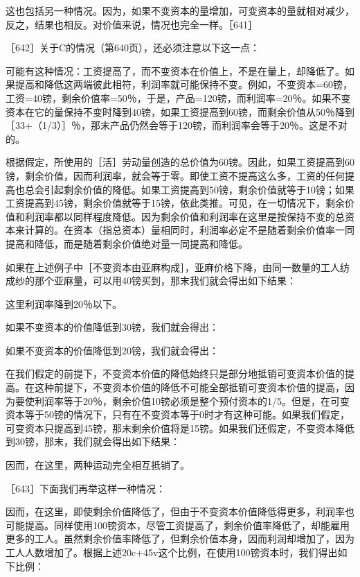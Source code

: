 这也包括另一种情况。因为，如果不变资本的量增加，可变资本的量就相对减少，反之，结果也相反。对价值来说，情况也完全一样。［641］


［642］关于C的情况（第640页），还必须注意以下这一点：

可能有这种情况：工资提高了，而不变资本在价值上，不是在量上，却降低了。如果提高和降低这两端彼此相符，利润率就可能保持不变。例如，不变资本=60镑，工资=40镑，剩余价值率=50％，于是，产品=120镑，而利润率=20％。如果不变资本在它的量保持不变时降到40镑，如果工资提高到60镑，而剩余价值从50％降到［33+（1/3）］％，那末产品仍然会等于120镑，而利润率会等于20％。这是不对的。

根据假定，所使用的［活］劳动量创造的总价值为60镑。因此，如果工资提高到60镑，剩余价值，因而利润率，就会等于零。即使工资不提高这么多，工资的任何提高也总会引起剩余价值的降低。如果工资提高到50镑，剩余价值就等于10镑；如果工资提高到45镑，剩余价值就等于15镑，依此类推。可见，在一切情况下，剩余价值和利润率都以同样程度降低。因为剩余价值和利润率在这里是按保持不变的总资本来计算的。在资本（指总资本）量相同时，利润率必定不是随着剩余价值率一同提高和降低，而是随着剩余价值绝对量一同提高和降低。

如果在上述例子中［不变资本由亚麻构成］，亚麻价格下降，由同一数量的工人纺成纱的那个亚麻量，可以用40镑买到，那末我们就会得出如下结果：

\todo{}

这里利润率降到20％以下。

如果不变资本的价值降低到30镑，我们就会得出：

\todo{}

如果不变资本的价值降低到20镑，我们就会得出：

\todo{}

在我们假定的前提下，不变资本价值的降低始终只是部分地抵销可变资本价值的提高。在这种前提下，不变资本价值的降低不可能全部抵销可变资本价值的提高，因为要使利润率等于20％，剩余价值10镑必须是整个预付资本的1/5。但是，在可变资本等于50镑的情况下，只有在不变资本等于0时才有这种可能。如果我们假定，可变资本只提高到45镑，那末剩余价值将是15镑。如果我们还假定，不变资本降低到30镑，那末，我们就会得出如下结果：

\todo{}

因而，在这里，两种运动完全相互抵销了。

［643］下面我们再举这样一种情况：

\todo{}

因而，在这里，即使剩余价值降低了，但由于不变资本价值降低得更多，利润率也可能提高。同样使用100镑资本，尽管工资提高了，剩余价值率降低了，却能雇用更多的工人。虽然剩余价值率降低了，但剩余价值本身，因而利润却增加了，因为工人人数增加了。根据上述20c+45v这个比例，在使用100镑资本时，我们得出如下比例：

